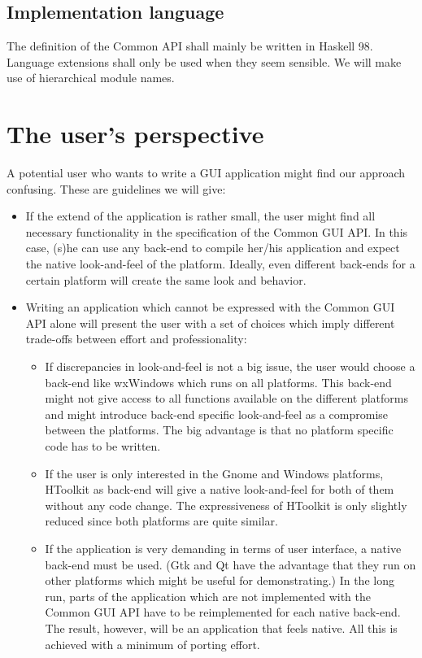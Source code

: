 \documentclass{article}
\begin{document}
\subsection{Implementation language}
The definition of the Common API shall mainly be written in Haskell
98. Language extensions shall only be used when they seem sensible. We
will make use of hierarchical module names.

\section{The user's perspective}
A potential user who wants to write a GUI application might find
our approach confusing. These are guidelines we will give:
\begin{itemize}
\item If the extend of the application is rather small, the user might
  find all necessary functionality in the specification of the Common
  GUI API. In this case, (s)he can use any back-end to compile her/his
  application and expect the native look-and-feel of the
  platform. Ideally, even different back-ends for a certain platform
  will create the same look and behavior.
\item Writing an application which cannot be expressed with the Common
  GUI API alone will present the user with a set of choices which
  imply different trade-offs between effort and professionality:
  \begin{itemize}
  \item If discrepancies in look-and-feel is not a big issue, the user
    would choose a back-end like wxWindows which runs on all
    platforms. This back-end might not give access to all functions
    available on the different platforms and might introduce back-end
    specific look-and-feel as a compromise between the platforms. The
    big advantage is that no platform specific code has to be written.
  \item If the user is only interested in the Gnome and Windows
    platforms, HToolkit as back-end will give a native look-and-feel
    for both of them without any code change. The expressiveness of
    HToolkit is only slightly reduced since both platforms are quite
    similar.
  \item If the application is very demanding in terms of user
    interface, a native back-end must be used. (Gtk and Qt have the
    advantage that they run on other platforms which might be useful
    for demonstrating.) In the long run, parts of the application
    which are not implemented with the Common GUI API have to be
    reimplemented for each native back-end. The result, however, will
    be an application that feels native. All this is achieved with a
    minimum of porting effort.
  \end{itemize}
\end{itemize}
\end{document}
